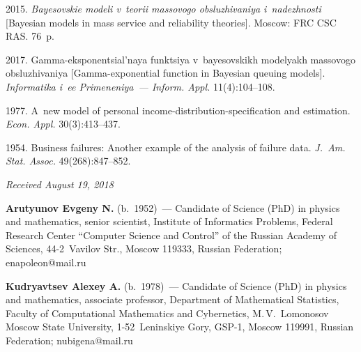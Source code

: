   \begin{multicols}{2}

\renewcommand{\bibname}{\protect\rmfamily References}

{\small\frenchspacing
 {%
 \begin{thebibliography}{9}

2015. \textit{Bayesovskie modeli v~teorii massovogo obsluzhivaniya i~nadezhnosti} 
[Bayesian models in mass service and reliability theories]. Moscow: 
FRC CSC RAS. 76~p.

 2017. 
Gamma-eksponentsial'naya funktsiya v~bayesovskikh modelyakh massovogo obsluzhivaniya 
[Gamma-exponential function in Bayesian queuing models]. 
\textit{Informatika i~ee Primeneniya~--- Inform. Appl.} 11(4):104--108.

 1977. 
A~new model of personal income-distribution-specification and estimation. 
\textit{Econ. Appl.} 30(3):413--437.

 1954. Business failures: Another 
example of the analysis of failure data. 
\textit{J.~Am. Stat. Assoc.} 49(268):847--852.
\end{thebibliography}

 }
 }

\end{multicols}

\vspace*{-6pt}

\hfill{\small\textit{Received August 19, 2018}}




\Contr

\noindent
\textbf{Arutyunov Evgeny N.} (b.\ 1952)~--- 
Candidate of Science (PhD) in physics and mathematics, senior scientist, 
Institute of Informatics Problems, Federal Research Center ``Computer 
Science and Control'' of the Russian Academy of Sciences, 44-2~Vavilov Str., 
Moscow 119333, Russian Federation; \mbox{enapoleon@mail.ru}

\vspace*{3pt}

\noindent
\textbf{Kudryavtsev Alexey A.} (b.\ 1978)~--- 
Candidate of Science (PhD) in physics and mathematics, associate professor, 
Department of Mathematical Statistics, Faculty of Computational Mathematics 
and Cybernetics, M.\,V.~Lomonosov Moscow State University, 1-52~Leninskiye Gory, 
GSP-1, Moscow 119991, Russian Federation; \mbox{nubigena@mail.ru}

